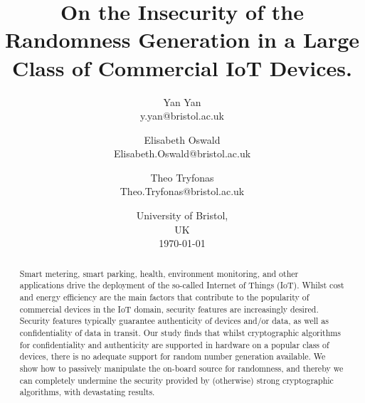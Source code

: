 \documentclass{article}
\title{On the Insecurity of the Randomness Generation in a Large Class of Commercial IoT Devices.}
\author{ 
Yan Yan \\ 
y.yan@bristol.ac.uk
\and
Elisabeth Oswald \\ 
Elisabeth.Oswald@bristol.ac.uk
\and
Theo Tryfonas \\ 
Theo.Tryfonas@bristol.ac.uk
}
\date{University of Bristol, \\ UK \\ \today}
\begin{document}
\maketitle

\begin{abstract}
Smart metering, smart parking, health, environment monitoring, and other applications drive the deployment of the so-called Internet of Things (IoT). Whilst cost and energy efficiency are the main factors that contribute to the popularity of commercial devices in the IoT domain, security features are increasingly desired. Security features typically guarantee authenticity of devices and/or data, as well as confidentiality of data in transit. Our study finds that whilst cryptographic algorithms for confidentiality and authenticity are supported in hardware on a popular class of devices, there is no adequate support for random number generation available. We show how to passively manipulate the on-board source for randomness, and thereby we can completely undermine the security provided by (otherwise) strong cryptographic algorithms, with devastating results. 
\end{abstract}









\appendix

\end{document}

